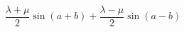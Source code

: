 \begin{displaymath}
 \frac{\lambda + \mu}{2}\sin(a+b) +\frac{\lambda -\mu}{2}\sin(a-b)
\end{displaymath}


